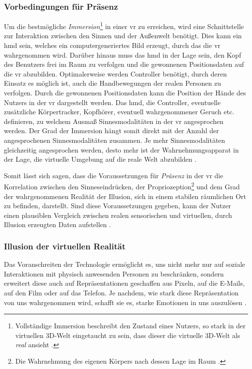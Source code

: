 \documentclass[a4paper,11pt]{article}%
\renewcommand{\\}{\vspace*{0.5\baselineskip} \newline}
\begin{document}
		\subsubsection{Vorbedingungen für Präsenz}
Um die bestmögliche \textit{Immersion}\footnote{Vollständige Immersion beschreibt den Zustand eines Nutzers, so stark in der virtuellen 3D-Welt eingetaucht zu sein, dass dieser die virtuelle 3D-Welt als \textit{real} ansieht \citep{biocca1992virtual}.} in einer \ac{vr} zu erreichen, wird eine Schnittstelle zur Interaktion zwischen den Sinnen und der Außenwelt benötigt. Dies kann ein \ac{hmd} sein, welches ein computergeneriertes Bild erzeugt, durch das die \ac{vr} wahrgenommen wird. Darüber hinaus muss das \ac{hmd} in der Lage sein, den Kopf des Benutzers frei im Raum zu verfolgen und die gewonnenen Positionsdaten auf die \ac{vr} abzubilden. Optimalerweise werden Controller benötigt, durch deren Einsatz es möglich ist, auch die Handbewegungen der realen Personen zu verfolgen. Durch die gewonnenen Positionsdaten kann die Position der Hände des Nutzers in der \ac{vr} dargestellt werden. Das \ac{hmd}, die Controller, eventuelle zusätzliche Körpertracker, Kopfhörer, eventuell wahrgenommener Geruch etc. definieren, zu welchem Ausmaß Sinnesmodalitäten in der \ac{vr} angesprochen werden. Der Grad der Immersion hängt somit direkt mit der Anzahl der angesprochenen Sinnesmodalitäten zusammen. Je mehr Sinnesmodalitäten gleichzeitig angesprochen werden, desto mehr ist der Wahrnehmungsapparat in der Lage, die virtuelle Umgebung auf die reale Welt abzubilden \citep{biocca1992virtual}.

Somit lässt sich sagen, dass die Voraussetzungen für \textit{Präsenz} in der \ac{vr} die Korrelation zwischen den Sinneseindrücken, der Propriozeption\footnote{Die Wahrnehmung des eigenen Körpers nach dessen Lage im Raum \citep[S. 23]{hafelinger2013koordinationstherapie}.} und dem Grad der wahrgenommenen Realität der Illusion, sich in einem stabilen räumlichen Ort zu befinden, darstellt. Sind diese Voraussetzungen gegeben, kann der Nutzer einen plausiblen Vergleich zwischen realen sensorischen und virtuellen, durch Illusion erzeugten Daten aufstellen \citep{slater2009we}.

		\subsubsection{Illusion der virtuellen Realität}
Das Voranschreiten der Technologie ermöglicht es, uns nicht mehr nur auf soziale Interaktionen mit physisch anwesenden Personen zu beschränken, sondern erweitert diese auch auf Repräsentationen geschaffen aus Pixeln, auf die E-Mails, auf den Film oder auf das Telefon. Je nachdem, wie stark diese Repräsentation von uns wahrgenommen wird, schafft sie es, starke Emotionen in uns auszulösen \citep[S. 4-6]{biocca2002defining}.
\end{document}
